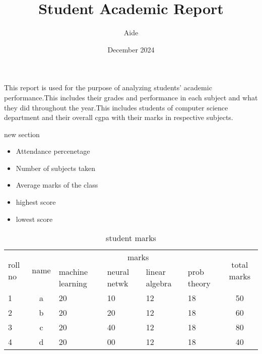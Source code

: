 \documentclass{article}
\title{\textbf{Student Academic Report}}
\author{Aide}
\date{December 2024}
\begin{document}
\maketitle
\noindent
This report is used for the purpose of analyzing students' academic performance.This includes their grades and performance in each subject and what they did throughout the year.This includes students of computer science department and their overall cgpa with their marks in respective subjects.
\begin{section}{new section}
    \begin{itemize}
        \item Attendance percenetage
        \item Number of subjects taken
        \item Average marks of the class
        \item highest score
        \item lowest score
    \end{itemize}
    \begin{table}[h]
    \centering
        \caption{student marks}
        \begin{tabular}{|p{1cm}|c|p{1.9cm}|p{1.9cm}|p{1.9cm}|p{1.9cm}|c|}
            \hline
            \multirow{2}{*}{roll no} & \multirow{2}{*}{name} & \multicolumn{4}{c|}{marks} & \multirow{2}{*}{total marks}            \\
            \cline{3-6}
             & & machine learning & neural netwk & linear algebra & prob theory & \\
             \hline
             1 & a & 20 &10 & 12 & 18 & 50 \\
             \hline
             2 & b & 20 &20 & 12 & 18 & 60 \\
             \hline
             3 & c & 20 &40 & 12 & 18 & 80 \\
             \hline
             4 & d & 20 &00 & 12 & 18 & 40 \\
             \hline
        \end{tabular}
    \end{table}
\end{section}
    
\end{document}
